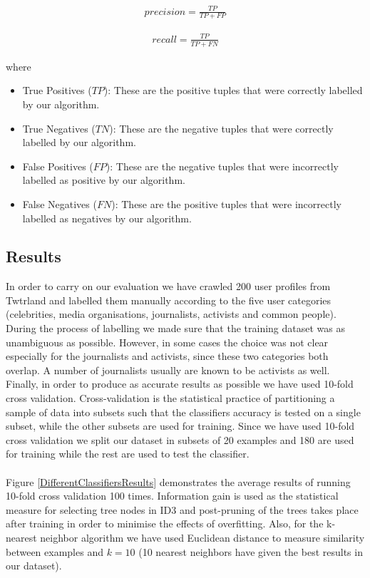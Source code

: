 \begin{eqnarray}
precision = \frac{TP}{TP + FP}
\end{eqnarray}  

\begin{eqnarray}
recall = \frac{TP}{TP + FN}
\end{eqnarray}  

where 

\begin{itemize}
  \item True Positives ($TP$): These are the positive tuples that were correctly labelled by our algorithm. 
  \item True Negatives ($TN$): These are the negative tuples that were correctly labelled by our algorithm.
  \item False Positives ($FP$): These are the negative tuples that were incorrectly labelled as positive by our algorithm.
  \item False Negatives ($FN$): These are the positive tuples that were incorrectly labelled as negatives by our algorithm.
\end{itemize}\vspace{15pt}

\subsection{Results}

In order to carry on our evaluation we have crawled 200 user profiles from Twtrland and labelled them manually according to the five user categories (celebrities, media organisations, journalists, activists and common people). During the process of labelling we made sure that the training dataset was as unambiguous as possible. However, in some cases the choice was not clear especially for the journalists and activists, since these two categories both overlap. A number of journalists usually are known to be activists as well. Finally, in order to produce as accurate results as possible we have used 10-fold cross validation. Cross-validation is the statistical practice of partitioning a sample of data into subsets such that the classifiers accuracy is tested on a single subset, while the other subsets are used for training. Since we have used 10-fold cross validation we split our dataset in subsets of 20 examples and 180 are used for training while the rest are used to test the classifier.\\\\
Figure \ref{DifferentClassifiersResults} demonstrates the average results of running 10-fold cross validation 100 times. Information gain is used as the statistical measure for selecting tree nodes in ID3 and post-pruning of the trees takes place after training in order to minimise the effects of overfitting. Also, for the k-nearest neighbor algorithm we have used Euclidean distance to measure similarity between examples and $k=10$ (10 nearest neighbors have given the best results in our dataset). 

